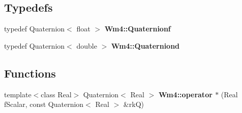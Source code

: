 \subsection*{Typedefs}
\begin{CompactItemize}
\item 
typedef Quaternion$<$ float $>$ {\bf Wm4::Quaternionf}
\item 
typedef Quaternion$<$ double $>$ {\bf Wm4::Quaterniond}
\end{CompactItemize}
\subsection*{Functions}
\begin{CompactItemize}
\item 
template$<$class Real$>$ Quaternion$<$ Real $>$ {\bf Wm4::operator $\ast$} (Real f\-Scalar, const Quaternion$<$ Real $>$ \&rk\-Q)
\end{CompactItemize}
